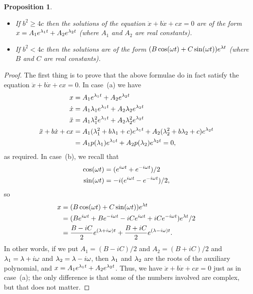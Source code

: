 \documentclass[reqno]{amsart}
\newtheorem{proposition}[theorem]{Proposition}
\theoremstyle{definition}
\begin{document}
\begin{proposition}\leavevmode
 \begin{itemize}
  \item[(a)] If $b^2\geq 4c$ then the solutions of the equation
   $\ddot{x}+b\dot{x}+cx=0$ are of the form
   $x=A_1e^{\lambda_1t}+A_2e^{\lambda_2t}$ (where $A_1$ and $A_2$ are real
   constants). 
  \item[(b)] If $b^2<4c$ then the solutions are of the form
   $(B\cos(\omega t)+C\sin(\omega t))e^{\lambda t}$ (where $B$ and $C$ are real
   constants). 
 \end{itemize}
\end{proposition}
\begin{proof}
 The first thing is to prove that the above formulae do in fact
 satisfy the equation $\ddot{x}+b\dot{x}+cx=0$.  In case~(a) we have
 \begin{align*}
  x        &= A_1e^{\lambda_1t} + A_2e^{\lambda_2t} \\
  \dot{x}  &= A_1\lambda_1e^{\lambda_1t} + A_2\lambda_2e^{\lambda_2t} \\
  \ddot{x} &= A_1\lambda_1^2e^{\lambda_1t} + A_2\lambda_2^2e^{\lambda_2t} \\
  \ddot{x}+b\dot{x}+cx &= 
   A_1(\lambda_1^2+b\lambda_1+c)e^{\lambda_1t} + A_2(\lambda_2^2+b\lambda_2+c)e^{\lambda_2t} \\
    &= A_1p(\lambda_1)e^{\lambda_1t} + A_2p(\lambda_2)e^{\lambda_2t} = 0,
 \end{align*}
 as required.  In case~(b), we recall that 
 \begin{align*}
  \cos(\omega t) &= (e^{i\omega t}+e^{-i\omega t})/2 \\
  \sin(\omega t) &= -i(e^{i\omega t}-e^{-i\omega t})/2,
 \end{align*}
 so 
 \begin{align*}
  x &= (B\cos(\omega t)+C\sin(\omega t))e^{\lambda t} \\
    &= (Be^{i\omega t}+Be^{-i\omega t}-iCe^{i\omega t}+iCe^{-i\omega t})e^{\lambda t}/2 \\
    &= \frac{B-iC}{2}e^{(\lambda+i\omega)t} + \frac{B+iC}{2}e^{(\lambda-i\omega)t}.
 \end{align*}
 In other words, if we put $A_1=(B-iC)/2$ and $A_2=(B+iC)/2$ and
 $\lambda_1=\lambda+i\omega$ and $\lambda_2=\lambda-i\omega$, then $\lambda_1$ and $\lambda_2$ are
 the roots of the auxiliary polynomial, and
 $x=A_1e^{\lambda_1t}+A_2e^{\lambda_2t}$.  Thus, we have
 $\ddot{x}+b\dot{x}+cx=0$ just as in case~(a); the only difference is
 that some of the numbers involved are complex, but that does not
 matter. 


\end{proof}
\end{document}
